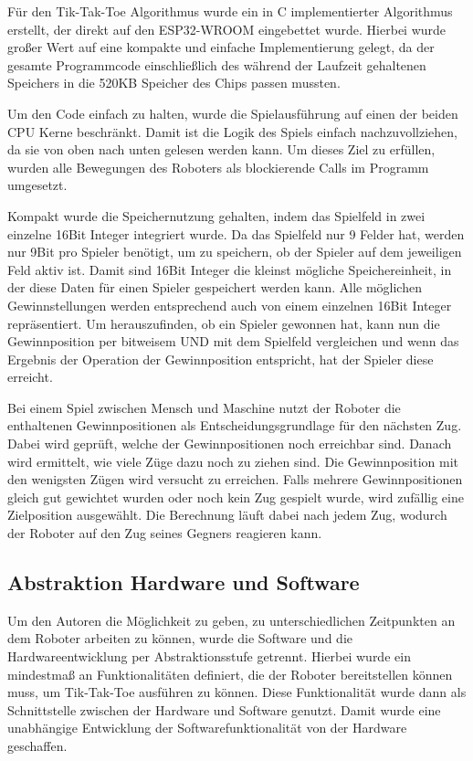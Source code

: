 \documentclass[conference,compsoc,final,a4paper]{IEEEtran}
\begin{document}
Für den Tik-Tak-Toe Algorithmus wurde ein in C implementierter Algorithmus erstellt, der direkt auf
den ESP32-WROOM eingebettet wurde. Hierbei wurde großer Wert auf eine kompakte und einfache
Implementierung gelegt, da der gesamte Programmcode einschließlich des während der Laufzeit
gehaltenen Speichers in die 520KB Speicher des Chips passen mussten.

Um den Code einfach zu halten, wurde die Spielausführung auf einen der beiden CPU Kerne beschränkt.
Damit ist die Logik des Spiels einfach nachzuvollziehen, da sie von oben nach unten gelesen werden kann.
Um dieses Ziel zu erfüllen, wurden alle Bewegungen des Roboters als blockierende Calls im Programm
umgesetzt.

Kompakt wurde die Speichernutzung gehalten, indem das Spielfeld in zwei einzelne 16Bit Integer integriert wurde.
Da das Spielfeld nur 9 Felder hat, werden nur 9Bit pro Spieler benötigt, um zu speichern, ob der Spieler
auf dem jeweiligen Feld aktiv ist. Damit sind 16Bit Integer die kleinst mögliche Speichereinheit, in der
diese Daten für einen Spieler gespeichert werden kann. Alle möglichen Gewinnstellungen werden entsprechend
auch von einem einzelnen 16Bit Integer repräsentiert. Um herauszufinden, ob ein Spieler gewonnen hat, kann
nun die Gewinnposition per bitweisem UND mit dem Spielfeld vergleichen und wenn das Ergebnis der Operation
der Gewinnposition entspricht, hat der Spieler diese erreicht.

Bei einem Spiel zwischen Mensch und Maschine nutzt der Roboter die enthaltenen Gewinnpositionen als
Entscheidungsgrundlage für den nächsten Zug. Dabei wird geprüft, welche der Gewinnpositionen noch erreichbar
sind. Danach wird ermittelt, wie viele Züge dazu noch zu ziehen sind. Die Gewinnposition mit den
wenigsten Zügen wird versucht zu erreichen. Falls mehrere Gewinnpositionen gleich gut gewichtet wurden
oder noch kein Zug gespielt wurde, wird zufällig eine Zielposition ausgewählt. Die Berechnung läuft
dabei nach jedem Zug, wodurch der Roboter auf den Zug seines Gegners reagieren kann.

\subsection{Abstraktion Hardware und Software}

Um den Autoren die Möglichkeit zu geben, zu unterschiedlichen Zeitpunkten an dem Roboter arbeiten
zu können, wurde die Software und die Hardwareentwicklung per Abstraktionsstufe getrennt. Hierbei wurde
ein mindestmaß an Funktionalitäten definiert, die der Roboter bereitstellen können muss, um Tik-Tak-Toe
ausführen zu können. Diese Funktionalität wurde dann als Schnittstelle zwischen der Hardware und Software
genutzt. Damit wurde eine unabhängige Entwicklung der Softwarefunktionalität von der Hardware geschaffen.
\end{document}

